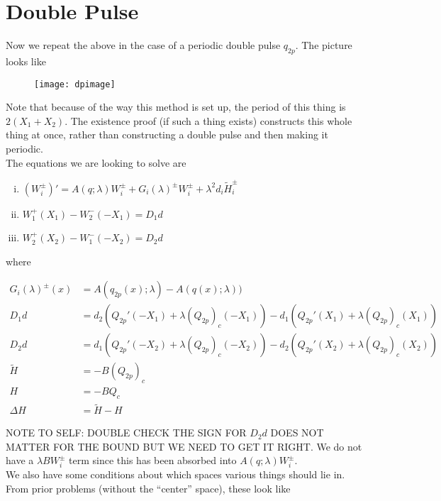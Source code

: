 \documentclass[12pt]{article}
\begin{document}
\section*{Double Pulse}

Now we repeat the above in the case of a periodic double pulse $q_{2p}$. The picture looks like

\begin{figure}[H]
\texttt{[image: dpimage]}
\end{figure}

Note that because of the way this method is set up, the period of this thing is $2(X_1 + X_2)$. The existence proof (if such a thing exists) constructs this whole thing at once, rather than constructing a double pulse and then making it periodic. \\

The equations we are looking to solve are

\begin{enumerate}[(i)]
\item $(W_i^\pm)' = A(q; \lambda) W_i^\pm + G_i(\lambda)^\pm W_i^\pm + \lambda^2 d_i \tilde{H}_i^\pm$
\item $W_1^+(X_1) - W_2^-(-X_1) = D_1 d$
\item $W_2^+(X_2) - W_1^-(-X_2) = D_2 d$
\end{enumerate}

where

\begin{align*}
G_i(\lambda)^\pm (x) &= A(q_{2p}(x);\lambda) - A(q(x);\lambda)) \\
D_1 d &= d_2(Q_{2p}'(-X_1) + \lambda (Q_{2p})_c(-X_1))
- d_1 ( Q_{2p}'(X_1) + \lambda (Q_{2p})_c(X_1) ) \\
D_2 d &= d_1(Q_{2p}'(-X_2) + \lambda (Q_{2p})_c(-X_2))
- d_2 ( Q_{2p}'(X_2) + \lambda (Q_{2p})_c(X_2) ) \\
\tilde{H} &= -B(Q_{2p})_c \\
H &= -B Q_c \\
\Delta H &= \tilde{H} - H
\end{align*}

NOTE TO SELF: DOUBLE CHECK THE SIGN FOR $D_2 d$ DOES NOT MATTER FOR THE BOUND BUT WE NEED TO GET IT RIGHT. We do not have a $\lambda B W_i^\pm$ term since this has been absorbed into $A(q; \lambda) W_i^\pm$. \\

We also have some conditions about which spaces various things should lie in. From prior problems (without the ``center'' space), these look like
\end{document}
